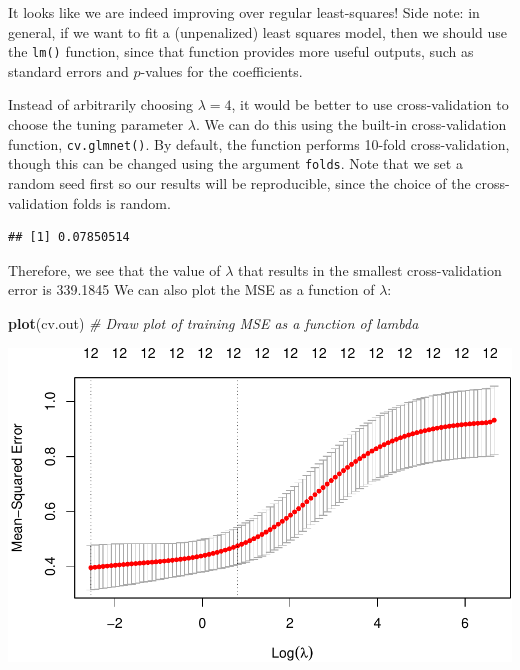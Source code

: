 \documentclass[]{article}
\newenvironment{Shaded}{\begin{snugshade}}{\end{snugshade}}
\newcommand{\KeywordTok}[1]{\textcolor[rgb]{0.13,0.29,0.53}{\textbf{#1}}}
\newcommand{\DataTypeTok}[1]{\textcolor[rgb]{0.13,0.29,0.53}{#1}}
\newcommand{\DecValTok}[1]{\textcolor[rgb]{0.00,0.00,0.81}{#1}}
\newcommand{\StringTok}[1]{\textcolor[rgb]{0.31,0.60,0.02}{#1}}
\newcommand{\CommentTok}[1]{\textcolor[rgb]{0.56,0.35,0.01}{\textit{#1}}}
\newcommand{\OperatorTok}[1]{\textcolor[rgb]{0.81,0.36,0.00}{\textbf{#1}}}
\newcommand{\NormalTok}[1]{#1}
\begin{document}
It looks like we are indeed improving over regular least-squares! Side
note: in general, if we want to fit a (unpenalized) least squares model,
then we should use the \texttt{lm()} function, since that function
provides more useful outputs, such as standard errors and \(p\)-values
for the coefficients.

Instead of arbitrarily choosing \(\lambda = 4\), it would be better to
use cross-validation to choose the tuning parameter \(\lambda\). We can
do this using the built-in cross-validation function,
\texttt{cv.glmnet()}. By default, the function performs 10-fold
cross-validation, though this can be changed using the argument
\texttt{folds}. Note that we set a random seed first so our results will
be reproducible, since the choice of the cross-validation folds is
random.

\begin{Shaded}
\end{Shaded}

\begin{verbatim}
## [1] 0.07850514
\end{verbatim}

Therefore, we see that the value of \(\lambda\) that results in the
smallest cross-validation error is 339.1845 We can also plot the MSE as
a function of \(\lambda\):

\begin{Shaded}
\begin{Highlighting}[]
\KeywordTok{plot}\NormalTok{(cv.out) }\CommentTok{# Draw plot of training MSE as a function of lambda}
\end{Highlighting}
\end{Shaded}

\includegraphics{BodyFat_files/figure-latex/unnamed-chunk-34-1.pdf}
\end{document}
